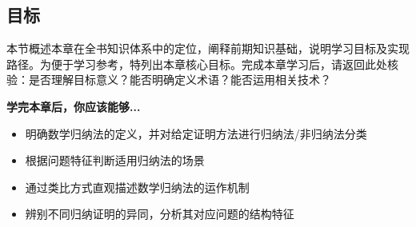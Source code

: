 \subsection{目标}

本节概述本章在全书知识体系中的定位，阐释前期知识基础，说明学习目标及实现路径。为便于学习参考，特列出本章核心目标。完成本章学习后，请返回此处核验：是否理解目标意义？能否明确定义术语？能否运用相关技术？

\textbf{学完本章后，你应该能够...}

\begin{itemize}
    \item 明确数学归纳法的定义，并对给定证明方法进行归纳法/非归纳法分类
    \item 根据问题特征判断适用归纳法的场景
    \item 通过类比方式直观描述数学归纳法的运作机制
    \item 辨别不同归纳证明的异同，分析其对应问题的结构特征
\end{itemize}
